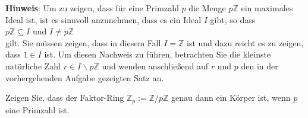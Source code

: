 \noindent
\textbf{Hinweis}: Um zu zeigen, dass für eine Primzahl $p$ die Menge $p\mathbb{Z}$ ein maximales
Ideal ist, ist es sinnvoll anzunehmen, dass es ein Ideal $I$
gibt, so dass
\\[0.2cm]
\hspace*{1.3cm}
$p\mathbb{Z} \subseteq I$ \quad und \quad $I \not= p\mathbb{Z}$
\\[0.2cm]
gilt.  Sie müssen zeigen, dass in diesem Fall $I = \mathbb{Z}$ ist und dazu reicht es zu zeigen,
dass $1 \in I$ ist.  Um diesen Nachweis zu führen, betrachten Sie die
kleinste natürliche Zahl $r \in I \backslash p\mathbb{Z}$ und wenden anschließend auf $r$ und $p$
den in der vorhergehenden Aufgabe gezeigten Satz an. \exend 

\exercise
Zeigen Sie, dass der Faktor-Ring $\mathbb{Z}_p := \mathbb{Z}/p\mathbb{Z}$ genau dann ein Körper ist,
wenn $p$ eine Primzahl ist.
\eox

